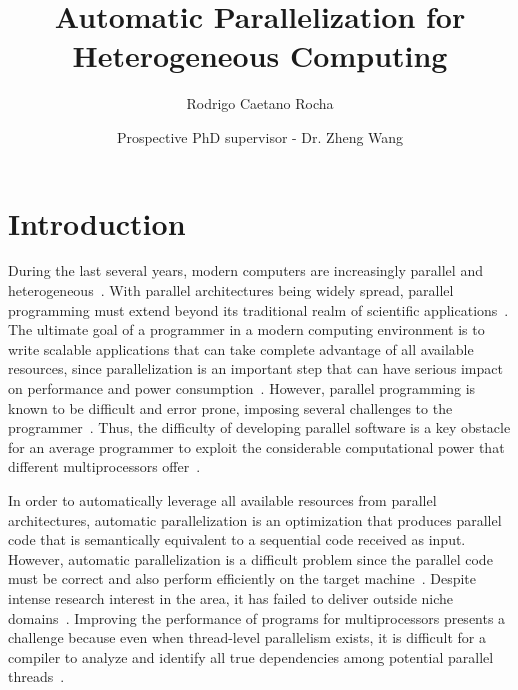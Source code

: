 \documentclass[a4paper,12pt]{article}
\title{\textbf{Automatic Parallelization for Heterogeneous Computing}}
\date{Prospective PhD supervisor - Dr. Zheng Wang}
\author[]{Rodrigo Caetano Rocha}
\newcommand\FIXME[1]{\textcolor{red}{FIX:}\textcolor{red}{#1}}
\begin{document}
\maketitle

\begin{abstract}

\end{abstract}

\section{Introduction} 


During the last several years, modern computers are increasingly parallel and
heterogeneous~\cite{mohanty12,misailovic13}.  With parallel architectures being
widely spread, parallel programming must extend beyond its traditional realm of
scientific applications~\cite{li09}.  The ultimate goal of a programmer in a
modern computing environment is to write scalable applications that can take
complete advantage of all available resources, since parallelization is an
important step that can have serious impact on performance and power
consumption~\cite{cockx10}.  However, parallel programming is known to be
difficult and error prone, imposing several challenges to the
programmer~\cite{cockx10,mccool10,mccool12}.  Thus, the difficulty of
developing parallel software is a key obstacle for an average programmer to
exploit the considerable computational power that different multiprocessors
offer~\cite{misailovic13}.

In order to automatically leverage all available resources from parallel
architectures, automatic parallelization is an optimization that produces
parallel code that is semantically equivalent to a sequential code received as
input.  However, automatic parallelization is a difficult problem since the
parallel code must be correct and also perform efficiently on the target
machine~\cite{williams99}.  Despite intense research interest in the area, it
has failed to deliver outside niche domains~\cite{tournavitis09,wang14a}.
Improving the performance of programs for multiprocessors presents a challenge
because even when thread-level parallelism exists, it is difficult for a
compiler to analyze and identify all true dependencies among potential parallel
threads~\cite{hammond98}.
\end{document}
